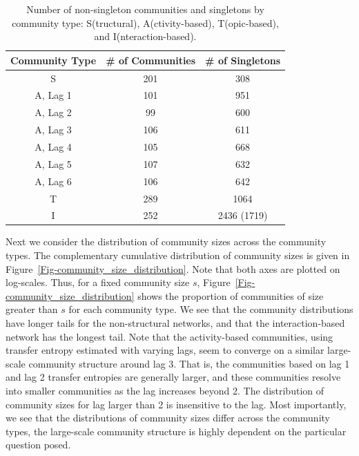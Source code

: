 \begin{table}[ht]
	\caption{Number of non-singleton communities and singletons by community type: S(tructural), A(ctivity-based), T(opic-based), and I(nteraction-based).}
	\centering
	\begin{tabular}{| c | c | c |}
		\hline Community Type & \# of Communities & \# of Singletons \\ \hline
		S & 201 & 308 \\
		A, Lag 1 & 101 & 951 \\
		A, Lag 2 & 99 & 600 \\
		A, Lag 3 & 106 & 611 \\
		A, Lag 4 & 105 & 668 \\
		A, Lag 5 & 107 & 632 \\
		A, Lag 6 & 106 & 642 \\
		T & 289 & 1064 \\
		I & 252 & 2436 (1719) \\ \hline
	\end{tabular}
	\label{Table-comm_count}
\end{table}

Next we consider the distribution of community sizes across the community types. The complementary cumulative distribution of community sizes is given in Figure~\ref{Fig-community_size_distribution}. Note that both axes are plotted on log-scales. Thus, for a fixed community size $s$, Figure~\ref{Fig-community_size_distribution} shows the proportion of communities of size greater than $s$ for each community type. We see that the community distributions have longer tails for the non-structural networks, and that the interaction-based network has the longest tail.
Note that the activity-based communities, using transfer entropy estimated with varying lags, seem to converge on a similar large-scale community structure around lag 3. That is, the communities based on lag 1 and lag 2 transfer entropies are generally larger, and these communities resolve into smaller communities as the lag increases beyond 2. The distribution of community sizes for lag larger than 2 is insensitive to the lag.
Most importantly, we see that the distributions of community sizes differ across the community types, the large-scale community structure is highly dependent on the particular question posed.

